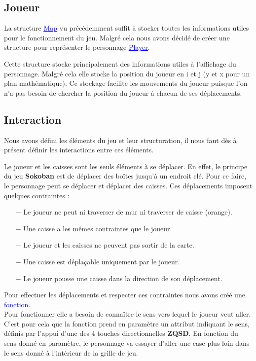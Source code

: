 \documentclass[french, 12pt]{article}
\begin{document}
   \subsection{Joueur}
       La structure \href{../doc/html/struct_map.html}{\textcolor{blue}{\underline{Map}}} vu précédemment suffit à stocker toutes les informations utiles pour le fonctionnement du jeu. Malgré cela nous avons décidé de créer une structure pour représenter le personnage \href{../doc/html/struct_player.html}{\textcolor{blue}{\underline{Player}}}.

       Cette structure stocke principalement des informations utiles à l'affichage du personnage. Malgré cela elle stocke la position du joueur en i et j (y et x pour un plan mathématique). Ce stockage facilite les mouvements du joueur puisque l'on n'a pas besoin de chercher la position du joueur à chacun de ses déplacements.


   \subsection{Interaction}
       Nous avons défini les éléments du jeu et leur structuration, il nous faut dès à présent définir les interactions entre ces éléments.

       Le joueur et les caisses sont les seuls éléments à se déplacer. En effet, le principe du jeu \textbf{Sokoban} est de déplacer des boîtes jusqu'à un endroit clé. Pour ce faire, le personnage peut se déplacer et déplacer des caisses. Ces déplacements imposent quelques contraintes :

       \begin{itemize}
           \item[$-$] Le joueur ne peut ni traverser de mur ni traverser de caisse (orange).
           \item[$-$] Une caisse a les mêmes contraintes que le joueur.
           \item[$-$] Le joueur et les caisses ne peuvent pas sortir de la carte.
           \item[$-$] Une caisse est déplaçable uniquement par le joueur.
           \item[$-$] Le joueur pousse une caisse dans la direction de son déplacement.
       \end{itemize}

       Pour effectuer les déplacements et respecter ces contraintes nous avons créé une \href{../doc/html/move_8h.html}{\textcolor{blue}{\underline{fonction}}}. \\
       Pour fonctionner elle a besoin de connaître le sens vers lequel le joueur veut aller. C'est pour cela que la fonction prend en paramètre un attribut indiquant le sens, définis par l'appui d'une des 4 touches directionnelles \textbf{ZQSD}. En fonction du sens donné en paramètre, le personnage va essayer d'aller une case plus loin dans le sens donné à l'intérieur de la grille de jeu.\\
\end{document}
